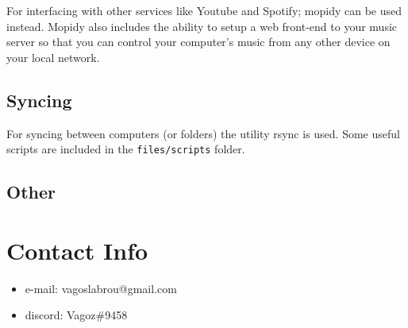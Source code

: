 \documentclass{article}
\let\src\texttt
\begin{document}
For interfacing with other services like Youtube and Spotify;
mopidy can be used instead. Mopidy also includes the ability to setup a web front-end to your music server 
so that you can control your computer's music from any other device on your local network.

\subsection{Syncing}

For syncing between computers (or folders) the utility rsync is used. 
Some useful scripts are included in the \src{files/scripts} folder.

\subsection{Other}


\section{Contact Info}

\begin{itemize}
    \item e-mail: vagoslabrou@gmail.com
    \item discord: Vagoz\#9458
\end{itemize}

\end{document}
